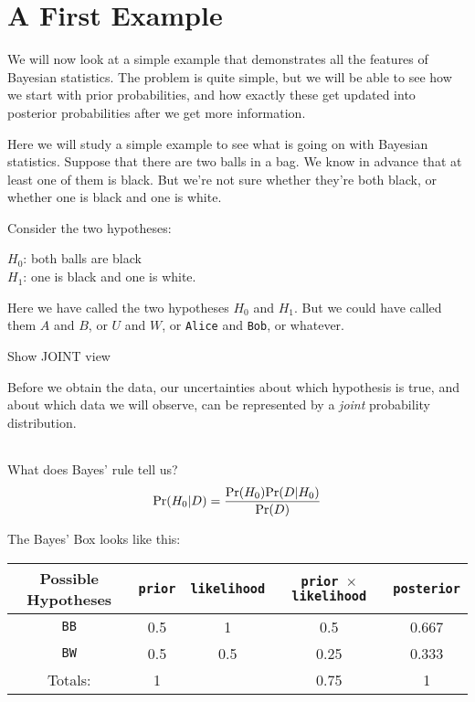\chapter{A First Example}

We will now look at a simple example that demonstrates all the features of
Bayesian statistics. The problem is quite simple, but we will be able to see
how we start with prior probabilities, and how exactly these get updated
into posterior probabilities after we get more information.


Here we will study a simple example to see what is going on with Bayesian
statistics. Suppose that there are two balls in a bag. We know in advance
that at least one of them is black. But we're not sure whether they're both
black, or whether one is black and one is white.

Consider the two hypotheses:

$H_0$: both balls are black\\
$H_1$: one is black and one is white.

Here we have called the two hypotheses $H_0$ and $H_1$. But we could have
called them $A$ and $B$, or $U$ and $W$, or {\tt Alice} and {\tt Bob}, or
whatever.


Show JOINT view

Before we obtain the data, our uncertainties about which hypothesis is true,
and about which data we will observe, can be represented by a {\it joint}
probability distribution.

\begin{table}
\begin{center}
\begin{tabular}{|c|c|c|}
\hline
\hline
\end{tabular}
\end{center}
\end{table}

What does Bayes' rule tell us?
\begin{eqnarray}
\textnormal{Pr}(H_0 | D) = \frac{\textnormal{Pr}(H_0)\textnormal{Pr}(D|H_0)}{\textnormal{Pr}(D)}
\end{eqnarray}




The Bayes' Box looks like this:
\begin{table}[h!]
\begin{center}
\begin{tabular}{|c|c|c|c|c|}
\hline
{\bf Possible Hypotheses} & {\tt prior} & {\tt likelihood} &
{\tt prior $\times$ likelihood} & {\tt posterior}\\
\hline
{\tt BB} & 0.5 & 1   & 0.5  & 0.667\\
{\tt BW} & 0.5 & 0.5 & 0.25 & 0.333\\
\hline
Totals: & 1 & & 0.75 & 1\\
\hline
\end{tabular}
\end{center}
\end{table}

